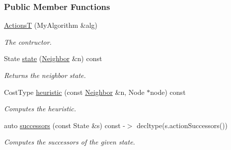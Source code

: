 \subsubsection*{Public Member Functions}
\begin{DoxyCompactItemize}
\item 
\hyperlink{structslb_1_1ext_1_1policy_1_1generator_1_1ActionsT_a83e52bad93bcfd08e47233e76da58f5c}{ActionsT} (My\+Algorithm \&alg)
\begin{DoxyCompactList}\small\item\em The contructor. \end{DoxyCompactList}\item 
State \hyperlink{structslb_1_1ext_1_1policy_1_1generator_1_1ActionsT_a4e5548e8e80b25751c5bf7ae3f9ad556}{state} (\hyperlink{structslb_1_1ext_1_1policy_1_1generator_1_1ActionsT_a7a3f1b03df5a856740e09ab6e455f571}{Neighbor} \&n) const 
\begin{DoxyCompactList}\small\item\em Returns the neighbor state. \end{DoxyCompactList}\item 
Cost\+Type \hyperlink{structslb_1_1ext_1_1policy_1_1generator_1_1ActionsT_a7afd0d6af61874bf4e7cad5d35e6ba09}{heuristic} (const \hyperlink{structslb_1_1ext_1_1policy_1_1generator_1_1ActionsT_a7a3f1b03df5a856740e09ab6e455f571}{Neighbor} \&n, Node $\ast$node) const 
\begin{DoxyCompactList}\small\item\em Computes the heuristic. \end{DoxyCompactList}\item 
auto \hyperlink{structslb_1_1ext_1_1policy_1_1generator_1_1ActionsT_aefb5d095dffb359b8b9c8b70b96fdf29}{successors} (const State \&s) const -\/$>$ decltype(s.\+action\+Successors())
\begin{DoxyCompactList}\small\item\em Computes the successors of the given state. \end{DoxyCompactList}\end{DoxyCompactItemize}
